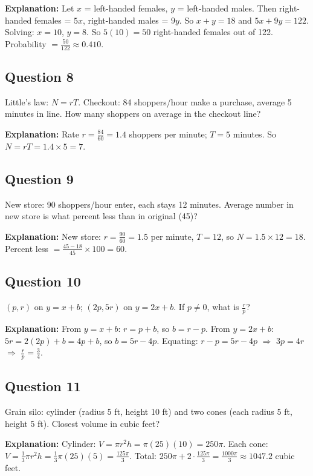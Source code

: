\textbf{Explanation:} Let $x$ = left-handed females, $y$ = left-handed males. Then right-handed females = $5x$, right-handed males = $9y$. So $x + y = 18$ and $5x + 9y = 122$. Solving: $x = 10$, $y = 8$. So $5(10) = 50$ right-handed females out of 122. Probability $= \frac{50}{122} \approx 0.410$.

\subsection*{Question 8}
Little's law: $N = rT$. Checkout: 84 shoppers/hour make a purchase, average 5 minutes in line. How many shoppers on average in the checkout line?

\textbf{Explanation:} Rate $r = \frac{84}{60} = 1.4$ shoppers per minute; $T = 5$ minutes. So $N = rT = 1.4 \times 5 = 7$.

\subsection*{Question 9}
New store: 90 shoppers/hour enter, each stays 12 minutes. Average number in new store is what percent less than in original (45)?

\textbf{Explanation:} New store: $r = \frac{90}{60} = 1.5$ per minute, $T = 12$, so $N = 1.5 \times 12 = 18$. Percent less $= \frac{45 - 18}{45} \times 100 = 60$.

\subsection*{Question 10}
$(p, r)$ on $y = x + b$; $(2p, 5r)$ on $y = 2x + b$. If $p \neq 0$, what is $\frac{r}{p}$?

\textbf{Explanation:} From $y = x + b$: $r = p + b$, so $b = r - p$. From $y = 2x + b$: $5r = 2(2p) + b = 4p + b$, so $b = 5r - 4p$. Equating: $r - p = 5r - 4p$ $\Rightarrow$ $3p = 4r$ $\Rightarrow$ $\frac{r}{p} = \frac{3}{4}$.

\newpage
\subsection*{Question 11}
Grain silo: cylinder (radius 5 ft, height 10 ft) and two cones (each radius 5 ft, height 5 ft). Closest volume in cubic feet?

\textbf{Explanation:} Cylinder: $V = \pi r^2 h = \pi (25)(10) = 250\pi$. Each cone: $V = \frac{1}{3}\pi r^2 h = \frac{1}{3}\pi(25)(5) = \frac{125\pi}{3}$. Total: $250\pi + 2 \cdot \frac{125\pi}{3} = \frac{1000\pi}{3} \approx 1047.2$ cubic feet.

